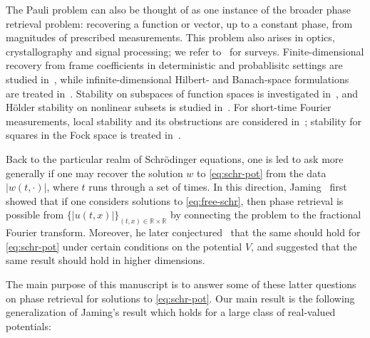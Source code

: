 \documentclass[11pt]{amsart}
\theoremstyle{remark}
\newcommand{\R}{\mathbb R}
\newcommand{\1}{\mathbf 1}
\begin{document}
The Pauli problem can also be thought of as one instance of the broader phase retrieval problem: recovering a function or vector, up to a constant phase, from magnitudes of prescribed measurements. This problem also arises in optics, crystallography and signal processing; we refer to~\cite{GrohsKoppensteinerRathmair,KlibanovSacksTikhonravov} for surveys. Finite-dimensional recovery from frame coefficients in deterministic and probablisitc settings are studied in~\cite{BalanCasazzaEdidin,CandesStrohmerVoroninski}, while infinite-dimensional Hilbert- and Banach-space formulations are treated in~\cite{AlaifariGrohs,CahillCasazzaDaubechies}. Stability on subspaces of function spaces is investigated in~\cite{AbdallaDeDiosRamosTaylor,ChristPineauTaylor,FreemanOikhbergPineauTaylor}, and H\"older stability on nonlinear subsets is studied in~\cite{FreemanTaylor}. For short-time Fourier measurements, local stability and its obstructions are considered in~\cite{AlaifariDaubechiesGrohsYin,AlaifariPineauTaylorWellershoff,BertoliniDeDiosPineauRamosTaylor,GrohsRathmair};  stability for squares in the Fock space is treated in~\cite{BortolottoRamos}.

Back to the particular realm of Schr\"odinger equations, one is led to ask more generally if one may recover the solution $w$ to \eqref{eq:schr-pot} from the data $|w(t,\cdot)|$, where $t$ runs through a set of times. In this direction, Jaming~\cite{Jaming2014} first showed that if one considers solutions to \eqref{eq:free-schr}, then phase retrieval is possible from $\{|u(t,x)|\}_{(t,x)\in\R\times\R}$ by connecting the problem to the fractional Fourier transform. Moreover, he later conjectured~\cite{Jaming2025} that the same should hold for \eqref{eq:schr-pot} under certain conditions on the potential $V$, and suggested that the same result should hold in higher dimensions.

The main purpose of this manuscript is to answer some of these latter questions on phase retrieval for solutions to \eqref{eq:schr-pot}. Our main result is the following generalization of Jaming's result which holds for a large class of real-valued potentials:
\end{document}
